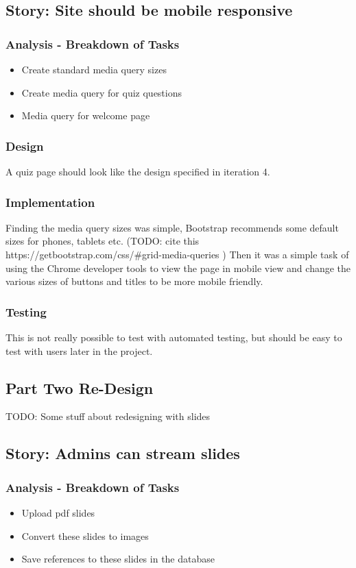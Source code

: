 \subsection{Story: Site should be mobile responsive}
\subsubsection{Analysis - Breakdown of Tasks}
\begin{itemize}
	\item Create standard media query sizes
	\item Create media query for quiz questions
	\item Media query for welcome page
\end{itemize}
\subsubsection{Design}
A quiz page should look like the design specified in iteration 4.
\subsubsection{Implementation}
Finding the media query sizes was simple, Bootstrap recommends some default sizes for phones, tablets etc. (TODO: cite this https://getbootstrap.com/css/\#grid-media-queries ) Then it was a simple task of using the Chrome developer tools to view the page in mobile view and change the various sizes of buttons and titles to be more mobile friendly.
\subsubsection{Testing}
This is not really possible to test with automated testing, but should be easy to test with users later in the project.
\newpage

\subsection{Part Two Re-Design}
TODO: Some stuff about redesigning with slides
\newpage

\subsection{Story: Admins can stream slides}
\subsubsection{Analysis - Breakdown of Tasks}
\begin{itemize}
	\item Upload pdf slides
	\item Convert these slides to images
	\item Save references to these slides in the database
\end{itemize}
